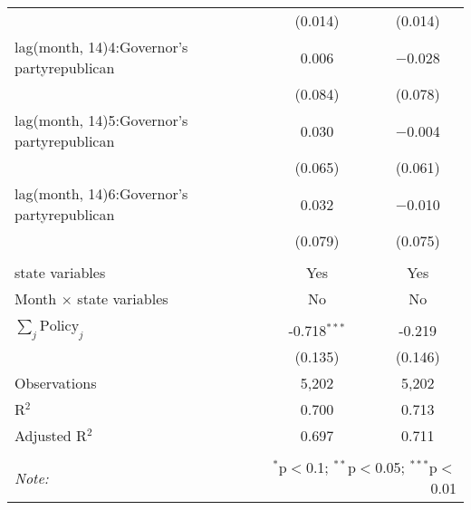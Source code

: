 \begin{tabular}{@{\extracolsep{1pt}}lcc}
  & (0.014) & (0.014) \\ 
  lag(month, 14)4:Governor's partyrepublican & 0.006 & $-$0.028 \\ 
  & (0.084) & (0.078) \\ 
  lag(month, 14)5:Governor's partyrepublican & 0.030 & $-$0.004 \\ 
  & (0.065) & (0.061) \\ 
  lag(month, 14)6:Governor's partyrepublican & 0.032 & $-$0.010 \\ 
  & (0.079) & (0.075) \\ 
 \hline \\[-1.8ex] 
state variables & Yes & Yes \\ 
Month $\times$ state variables & No & No \\ 
\hline \\[-1.8ex] 
$\sum_j \mathrm{Policy}_j$ & -0.718$^{***}$ & -0.219 \\ 
 & (0.135) & (0.146) \\ 
Observations & 5,202 & 5,202 \\ 
R$^{2}$ & 0.700 & 0.713 \\ 
Adjusted R$^{2}$ & 0.697 & 0.711 \\ 
\hline 
\hline \\[-1.8ex] 
\textit{Note:}  & \multicolumn{2}{r}{$^{*}$p$<$0.1; $^{**}$p$<$0.05; $^{***}$p$<$0.01} \\ 
\end{tabular} 